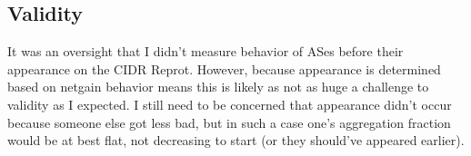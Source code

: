\subsection{Validity}
It was an oversight that I didn't measure behavior of ASes before their appearance on the CIDR Reprot. However, because appearance is determined based on netgain behavior means this is likely as not as huge a challenge to validity as I expected. I still need to be concerned that appearance didn't occur because someone else got less bad, but in such a case one's aggregation fraction would be at best flat, not decreasing to start (or they should've appeared earlier).



%
%
%
%
%
%
%
%
%

